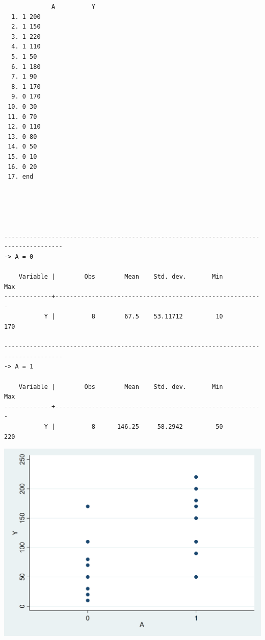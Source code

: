 \documentclass[
  10pt,
  a4paper,
]{book}
\begin{document}
\begin{verbatim}
             A          Y
  1. 1 200
  2. 1 150
  3. 1 220
  4. 1 110
  5. 1 50
  6. 1 180
  7. 1 90
  8. 1 170
  9. 0 170
 10. 0 30
 11. 0 70
 12. 0 110
 13. 0 80
 14. 0 50
 15. 0 10
 16. 0 20
 17. end





--------------------------------------------------------------------------------------
-> A = 0

    Variable |        Obs        Mean    Std. dev.       Min        Max
-------------+---------------------------------------------------------
           Y |          8        67.5    53.11712         10        170

--------------------------------------------------------------------------------------
-> A = 1

    Variable |        Obs        Mean    Std. dev.       Min        Max
-------------+---------------------------------------------------------
           Y |          8      146.25     58.2942         50        220
\end{verbatim}

\begin{center}\includegraphics[width=0.85\linewidth]{figs/stata-fig-11-1} \end{center}
\end{document}
